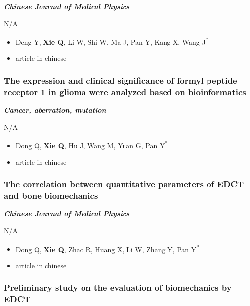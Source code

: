 \documentclass[
]{article}
\providecommand{\tightlist}{%
  \setlength{\itemsep}{0pt}\setlength{\parskip}{0pt}}
\begin{document}
\textbf{\emph{Chinese Journal of Medical Physics}}

N/A

\begin{itemize}
\tightlist
\item
  Deng Y, \textbf{Xie Q}, Li W, Shi W, Ma J, Pan Y, Kang X, Wang
  J\textsuperscript{*}
\item
  article in chinese
\end{itemize}

\hypertarget{the-expression-and-clinical-significance-of-formyl-peptide-receptor-1-in-glioma-were-analyzed-based-on-bioinformatics}{%
\subsubsection{The expression and clinical significance of formyl
peptide receptor 1 in glioma were analyzed based on
bioinformatics}\label{the-expression-and-clinical-significance-of-formyl-peptide-receptor-1-in-glioma-were-analyzed-based-on-bioinformatics}}

\textbf{\emph{Cancer, aberration, mutation}}

N/A

\begin{itemize}
\tightlist
\item
  Dong Q, \textbf{Xie Q}, Hu J, Wang M, Yuan G, Pan Y\textsuperscript{*}
\item
  article in chinese
\end{itemize}

\hypertarget{the-correlation-between-quantitative-parameters-of-edct-and-bone-biomechanics}{%
\subsubsection{The correlation between quantitative parameters of EDCT
and bone
biomechanics}\label{the-correlation-between-quantitative-parameters-of-edct-and-bone-biomechanics}}

\textbf{\emph{Chinese Journal of Medical Physics}}

N/A

\begin{itemize}
\tightlist
\item
  Dong Q, \textbf{Xie Q}, Zhao R, Huang X, Li W, Zhang Y, Pan
  Y\textsuperscript{*}
\item
  article in chinese
\end{itemize}

\hypertarget{preliminary-study-on-the-evaluation-of-biomechanics-by-edct}{%
\subsubsection{Preliminary study on the evaluation of biomechanics by
EDCT}\label{preliminary-study-on-the-evaluation-of-biomechanics-by-edct}}
\end{document}
